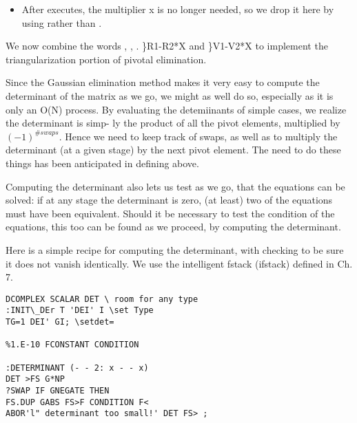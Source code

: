 \begin{itemize}
    \item  After  executes, the multiplier x is no longer needed,
        so we drop it here by using  rather than .
\end{itemize}

We now combine the words , , .
\}R1-R2*X and \}V1-V2*X to implement the triangularization portion of pivotal elimination.

Since the Gaussian elimination method makes it very easy to
compute the determinant of the matrix as we go, we might as well
do so, especially as it is only an O(N) process. By evaluating the
detemiinants of simple cases, we realize the determinant is simp-
ly the product of all the pivot elements, multiplied by
$(-1)^{\#swaps}$. Hence we need to keep track of swaps, as well as to
multiply the determinant (at a given stage) by the next pivot
element. The need to do these things has been anticipated in
defining  above.

Computing the determinant also lets us test as we go, that the
equations can be solved: if at any stage the determinant is zero,
(at least) two of the equations must have been equivalent. Should
it be necessary to test the condition of the equations, this too
can be found as we proceed, by computing the determinant.

Here is a simple recipe for computing the determinant, with
checking to be sure it does not vanish identically. We use the
intelligent fstack (ifstack) defined in Ch. 7.

\begin{verbatim}
DCOMPLEX SCALAR DET \ room for any type
:INIT\_DEr T 'DEI' I \set Type
TG=1 DEI' GI; \setdet=

%1.E-10 FCONSTANT CONDITION

:DETERMINANT (- - 2: x - - x)
DET >FS G*NP
?SWAP IF GNEGATE THEN
FS.DUP GABS FS>F CONDITION F<
ABOR'l" determinant too small!' DET FS> ;

\end{verbatim} 


